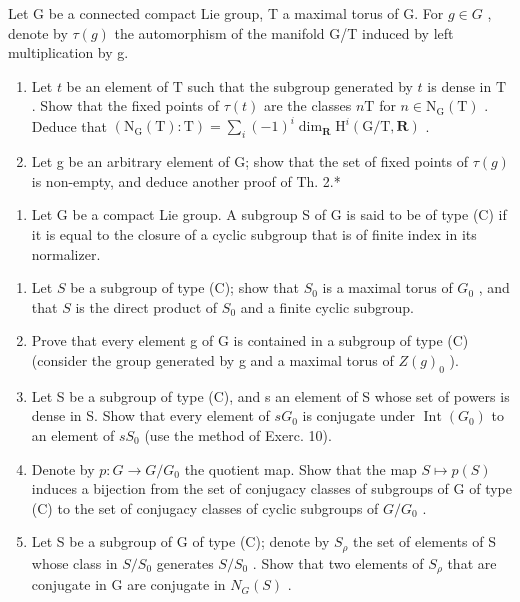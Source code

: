 Let G be a connected compact Lie group, T a maximal torus of G. For \(g \in G\) , denote by \(\tau(g)\) the automorphism of the manifold G/T induced by left multiplication by g.

\begin{enumerate}
\def\labelenumi{\alph{enumi})}
\item
  Let \(t\) be an element of \(\mathrm{T}\) such that the subgroup generated by \(t\) is dense in \(\mathrm{T}\) . Show that the fixed points of \(\tau(t)\) are the classes \(n\mathrm{T}\) for \(n \in \mathrm{N}_{\mathrm{G}}(\mathrm{T})\) . Deduce that \((\mathrm{N}_{\mathrm{G}}(\mathrm{T}):\mathrm{T}) = \sum_{i}(-1)^{i}\dim_{\mathbf{R}}\mathrm{H}^{i}(\mathrm{G / T},\mathbf{R})\) .
\item
  Let g be an arbitrary element of G; show that the set of fixed points of \(\tau(g)\) is non-empty, and deduce another proof of Th. 2.*
\end{enumerate}

\begin{enumerate}
\def\labelenumi{\arabic{enumi})}
\setcounter{enumi}{10}
\tightlist
\item
  Let G be a compact Lie group. A subgroup S of G is said to be of type (C) if it is equal to the closure of a cyclic subgroup that is of finite index in its normalizer.
\end{enumerate}

\begin{enumerate}
\def\labelenumi{\alph{enumi})}
\item
  Let \(S\) be a subgroup of type (C); show that \(S_0\) is a maximal torus of \(G_0\) , and that \(S\) is the direct product of \(S_0\) and a finite cyclic subgroup.
\item
  Prove that every element g of G is contained in a subgroup of type (C) (consider the group generated by g and a maximal torus of \(Z(g)_{0}\) ).
\item
  Let S be a subgroup of type (C), and s an element of S whose set of powers is dense in S. Show that every element of \(sG_{0}\) is conjugate under \(\operatorname{Int}(G_{0})\) to an element of \(sS_{0}\) (use the method of Exerc. 10).
\item
  Denote by \(p: G \to G/G_{0}\) the quotient map. Show that the map \(S \mapsto p(S)\) induces a bijection from the set of conjugacy classes of subgroups of G of type (C) to the set of conjugacy classes of cyclic subgroups of \(G/G_{0}\) .
\item
  Let S be a subgroup of G of type (C); denote by \(S_{\rho}\) the set of elements of S whose class in \(S/S_{0}\) generates \(S/S_{0}\) . Show that two elements of \(S_{\rho}\) that are conjugate in G are conjugate in \(N_{G}(S)\) .
\end{enumerate}
\relax{}
